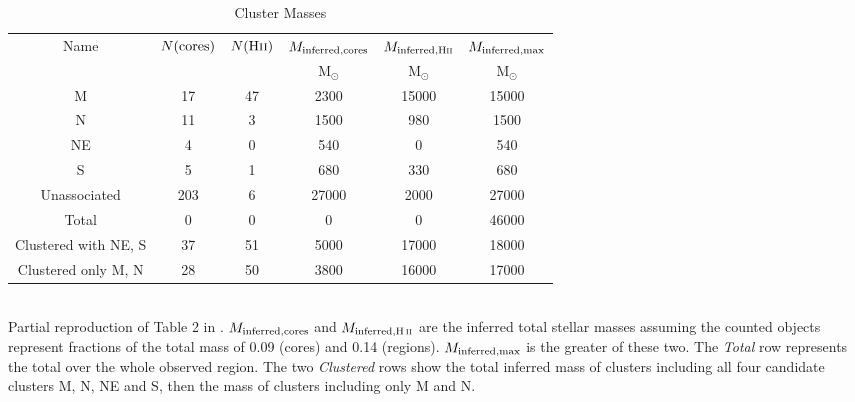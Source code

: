 \begin{table*}[htp]
\centering
\begin{minipage}{130mm}
\caption{Cluster Masses}
\begin{tabular}{cccccc}
\label{tab:clustermassestimates}
Name & $N({\rm cores})$ & $N({\rm H\textsc{ii}})$ & $M_{\rm inferred, cores}$ & $M_{\rm inferred, H\textsc{ii}}$ & $M_{\rm inferred,max}$ \\
 &  &  & $\mathrm{M_{\odot}}$ & $\mathrm{M_{\odot}}$ & $\mathrm{M_{\odot}}$ \\
\hline
M & 17 & 47 & 2300 & 15000 & 15000 \\
N & 11 & 3 & 1500 & 980 & 1500 \\
NE & 4 & 0 & 540 & 0 & 540 \\
S & 5 & 1 & 680 & 330 & 680 \\
Unassociated & 203 & 6 & 27000 & 2000 & 27000 \\
Total & 0 & 0 & 0 & 0 & 46000 \\
Clustered with NE, S & 37 & 51 & 5000 & 17000 & 18000 \\
Clustered only M, N & 28 & 50 & 3800 & 16000 & 17000 \\
\hline
\end{tabular}
\\
Partial reproduction of Table 2 in \citet{Ginsburg2018a}. $M_{\rm inferred,cores}$ and $M_{\rm inferred,\hii}$ are the inferred total stellar masses assuming the counted objects represent fractions of the total mass of 0.09 (cores) and 0.14 (\hii regions).  $M_{\rm inferred,max}$ is the greater of these two.  The \emph{Total} row represents the total over the whole observed region.  The two \emph{Clustered} rows show the total inferred mass of clusters including all four candidate clusters M, N, NE and S, then the mass of clusters including only M and N.
\end{minipage}
\end{table*}
